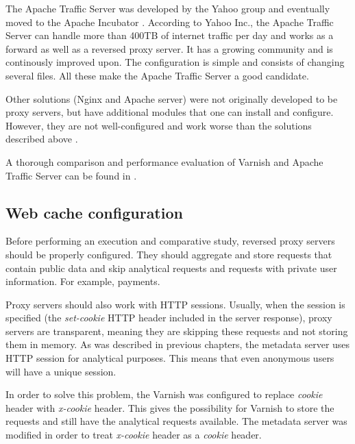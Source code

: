 The Apache Traffic Server was developed by the Yahoo group and eventually moved to the Apache Incubator \cite{GuApacheTrafficUri}. According to Yahoo Inc., the Apache Traffic Server can handle more than 400TB of internet traffic per day and works as a forward as well as a reversed proxy server. It has a growing community and is continously improved upon. The configuration is simple and consists of changing several files. All these make the Apache Traffic Server a good candidate.  

Other solutions (Nginx and Apache server) were not originally developed to be proxy servers, but have additional modules that one can install and configure. However, they are not well-configured and work worse than the solutions described above \cite{GuApacheTrafficUri}.

A thorough comparison and performance evaluation of Varnish and Apache Traffic Server can be found in \cite{VarnApacheReverse}.    


\subsection{Web cache configuration}

Before performing an execution and comparative study, reversed proxy servers should be properly configured. They should aggregate and store requests that contain public data and skip analytical requests and requests with private user information. For example, payments.

Proxy servers should also work with HTTP sessions. Usually, when the session is specified (the \textit{set-cookie} HTTP header included in the server response), proxy servers are transparent, meaning they are skipping these requests and not storing them in memory. As was described in previous chapters, the metadata server uses HTTP session for analytical purposes. This means that even anonymous users will have a unique session. 

In order to solve this problem, the Varnish was configured to replace \textit{cookie} header with \textit{x-cookie} header. This gives the possibility for Varnish to store the requests and still have the analytical requests available. The metadata server was modified in order to treat \textit{x-cookie} header as a \textit{cookie} header.   

